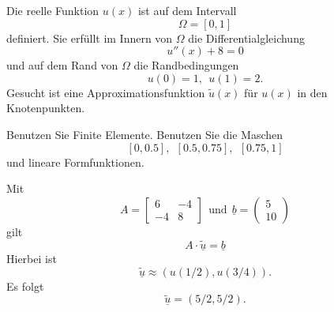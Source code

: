 Die reelle Funktion $u(x)$ ist auf dem Intervall
\[
\Omega = [0, 1]
\]
definiert. Sie erfüllt im Innern von $\Omega$ die Differentialgleichung 
\[
u''(x) + 8 = 0
\]
und auf dem Rand von $\Omega$ die Randbedingungen 
\[
u(0) = 1, \ \ u(1) = 2.
\]
Gesucht ist eine Approximationsfunktion $\tilde u(x)$ für $u(x)$
in den Knotenpunkten.

\vspace{2mm}

Benutzen Sie Finite Elemente. Benutzen Sie die Maschen
\[
[0,0.5], \ \ [0.5, 0.75], \ \ [0.75, 1]
\]
und lineare Formfunktionen.

\begin{loesung}
Mit
\[
A = \left[\begin{array}{rr} 6 & -4  \\ -4 & 8  \end{array}\right] \ \ \mbox{und} \ \
  \underline{b} =  \left(\begin{array}{r} 5 \\ 10 \end{array}\right)
\]
gilt  
\[
A \cdot \underline{\tilde u} = \underline{b}
\]
Hierbei ist
\[
\underline{\tilde u} \approx (u(1/2), u(3/4)).
\]
Es folgt 
\[
\underline{\tilde u} = (5/2,5/2).
\]
\end{loesung}
